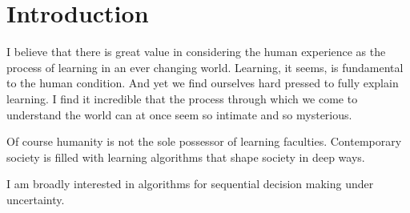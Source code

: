 \section*{Introduction}
I believe that there is great value in considering the human experience as the process of learning in an ever changing world. Learning, it seems, is fundamental to the human condition. And yet we find ourselves hard pressed to fully explain learning. I find it incredible that the process through which we come to understand the world can at once seem so intimate and so mysterious. 

Of course humanity is not the sole possessor of learning faculties. Contemporary society is filled with learning algorithms that shape society in deep ways. 

I am broadly interested in algorithms for sequential decision making under uncertainty.
